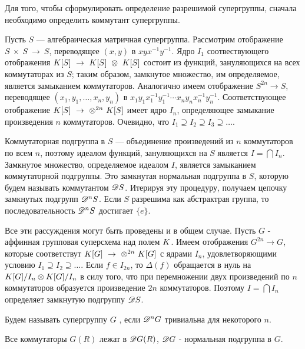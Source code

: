 Для того, чтобы сформулировать определение разрешимой супергруппы,
сначала необходимо определить коммутант супергруппы.

Пусть $ S $ --- алгебраическая матричная супергруппа. Рассмотрим отображение
$ S ~\times ~S ~\to ~S $, переводящее $ (x, y) $ в $ xyx^{-1}y^{-1} $.
Ядро $ I_{1} $ соотвествующего отображения $ K[S] ~\to ~K[S] ~\otimes ~K[S] $
состоит из функций, зануляющихся на всех коммутаторах из $ S $;
таким образом, замкнутое множество, им определяемое, является замыканием коммутаторов.
Аналогично имеем отображение $ S^{2n} \to S $, переводящее $ (x_1, y_1, \ldots, x_n, y_n) $ в 
$ x_1y_1x_1^{-1}y_1^{-1} \cdots x_ny_nx_n^{-1}y_n^{-1} $.
Соответствующее отображение $ K[S] ~\to ~\otimes^{2n} ~K[S] $ имеет ядро
$ I_n $, определяющее замыкание произведения $ n $ коммутаторов. 
Очевидно, что $ I_1 \supseteq I_2 \supseteq I_3 \supseteq \ldots $.

Коммутаторная подгруппа в $ S $ --- объединение произведений из $ n $ 
коммутаторов по всем $ n $, поэтому идеалом функций, зануляющихся на $ S $ является $ I = \bigcap I_n $.
Замкнутое множество, определяемое идеалом $ I $, является замыканием коммутаторной подгруппы.
Это замкнутая нормальная подгруппа в $ S $, которую будем называть коммутантом $ \mathscr{D} S $.
Итерируя эту процедуру, получаем цепочку замкнутых подгрупп $ \mathscr{D}^{n} S $.
Если $ S $ разрешима как абстрактрая группа, то последовательность $ \mathscr{D}^{n} S $ достигает $ \{e\} $.


Все эти рассуждения могут быть проведены и в общем случае.
Пусть $ G $ - аффинная групповая суперсхема над полем $ K $.
Имеем отображения $ G^{2n} \to G $, которые соответствут $ K[G] ~\to ~\otimes^{2n} ~K[G] $
с ядрами $ I_n $, удовлетворяющими условию $ I_1 \supseteq I_2 \supseteq \ldots $.
Если $ f \in I_{2n} $, то $ \Delta(f) $ обращается в нуль на $ K[G] / I_n \otimes K[G] / I_n $
в силу того, что при перемножении двух произведений по $ n $ коммутаторов образуется произведение $ 2n $ коммутаторов.
Поэтому $ I = \bigcap I_n $ определяет замкнутую подгруппу $ \mathscr{D} S $.

\begin{definition}
  Будем называть супергруппу $ G $ , если $ \mathscr{D}^{n} G $ тривиальна для некоторого $ n $.
\end{definition}


\begin{remark}
  Все коммутаторы $ G(R) $ лежат в $ \mathscr{D} G(R) $, $ \mathscr{D} G $ - нормальная подгруппа в $ G $.
\end{remark}

